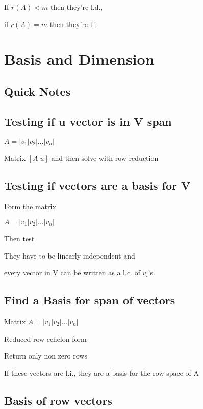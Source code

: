 \documentclass{extarticle}
\begin{document}
\begin{multicols}{2}
\begin{tcolorbox}[enhanced jigsaw,sharp corners,coltext=black,colback=Green!25!white,boxrule=0pt,breakable,size=minimal]
If $r(A) < m$ then they're l.d.,

if $r(A) = m$ then they're l.i.
\end{tcolorbox}








\section{Basis and Dimension}
\subsection{Quick Notes}
\subsection{Testing if u vector is in V span}

$A = \left|v_1|v_2|...|v_n\right|$

Matrix $[A|u]$ and then solve with row reduction


\subsection{Testing if vectors are a basis for V}

Form the matrix

$A = \left|v_1|v_2|...|v_n\right|$

Then test

They have to be linearly independent and 

every vector in V can be written as a l.c. of $v_i$'s.





\subsection{Find a Basis for span of vectors}

Matrix $A = \left|v_1|v_2|...|v_n\right|$

Reduced row echelon form

Return only non zero rows

If these vectors are l.i., they are a basis for the row space of A





\subsection{Basis of row vectors}


\end{multicols}
\end{document}
